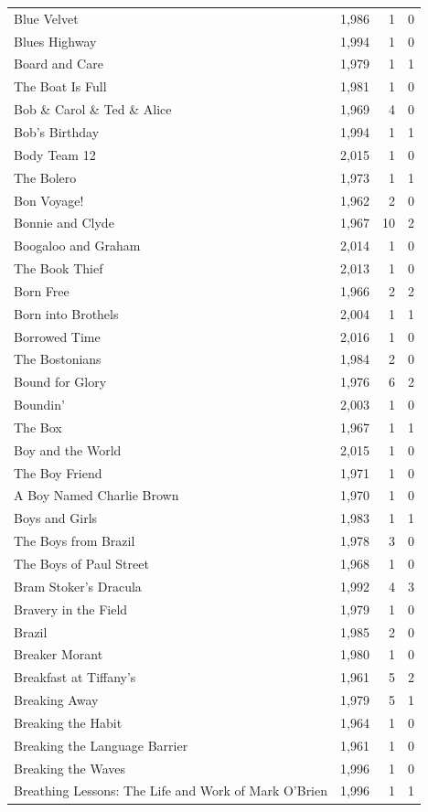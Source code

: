 \begin{tabular}{lrrr}
Blue Velvet & 1,986 & 1 & 0 \\
Blues Highway & 1,994 & 1 & 0 \\
Board and Care & 1,979 & 1 & 1 \\
The Boat Is Full & 1,981 & 1 & 0 \\
Bob \& Carol \& Ted \& Alice & 1,969 & 4 & 0 \\
Bob's Birthday & 1,994 & 1 & 1 \\
Body Team 12 & 2,015 & 1 & 0 \\
The Bolero & 1,973 & 1 & 1 \\
Bon Voyage! & 1,962 & 2 & 0 \\
Bonnie and Clyde & 1,967 & 10 & 2 \\
Boogaloo and Graham & 2,014 & 1 & 0 \\
The Book Thief & 2,013 & 1 & 0 \\
Born Free & 1,966 & 2 & 2 \\
Born into Brothels & 2,004 & 1 & 1 \\
Borrowed Time & 2,016 & 1 & 0 \\
The Bostonians & 1,984 & 2 & 0 \\
Bound for Glory & 1,976 & 6 & 2 \\
Boundin' & 2,003 & 1 & 0 \\
The Box & 1,967 & 1 & 1 \\
Boy and the World & 2,015 & 1 & 0 \\
The Boy Friend & 1,971 & 1 & 0 \\
A Boy Named Charlie Brown & 1,970 & 1 & 0 \\
Boys and Girls & 1,983 & 1 & 1 \\
The Boys from Brazil & 1,978 & 3 & 0 \\
The Boys of Paul Street & 1,968 & 1 & 0 \\
Bram Stoker's Dracula & 1,992 & 4 & 3 \\
Bravery in the Field & 1,979 & 1 & 0 \\
Brazil & 1,985 & 2 & 0 \\
Breaker Morant & 1,980 & 1 & 0 \\
Breakfast at Tiffany's & 1,961 & 5 & 2 \\
Breaking Away & 1,979 & 5 & 1 \\
Breaking the Habit & 1,964 & 1 & 0 \\
Breaking the Language Barrier & 1,961 & 1 & 0 \\
Breaking the Waves & 1,996 & 1 & 0 \\
Breathing Lessons: The Life and Work of Mark O'Brien & 1,996 & 1 & 1 \\

\end{tabular}
